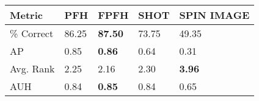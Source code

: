 \begin{tabular}{ | l || l | l | l | l | }
\hline
Metric & PFH & FPFH & SHOT & SPIN IMAGE \\
\hline
 \% Correct & 86.25 & \bf 87.50 & 73.75 & 49.35 \\
AP & 0.85 & \bf 0.86 & 0.64 & 0.31 \\
Avg. Rank & 2.25 & 2.16 & 2.30 & \bf 3.96 \\
AUH & 0.84 & \bf 0.85 & 0.84 & 0.65 \\
\hline
\end{tabular}